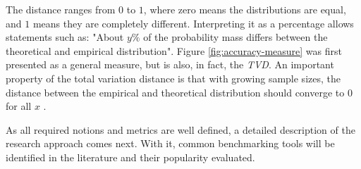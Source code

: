 The distance ranges from $0$ to $1$, where zero means the distributions are equal, and $1$ means they are completely different. Interpreting it as a percentage allows statements such as:
"About $y\%$ of the probability mass differs between the theoretical and empirical distribution". Figure \ref{fig:accuracy-measure} was first presented as a general measure,
but is also, in fact, the \textit{TVD}. An important property of the total variation distance is that with growing sample sizes,
the distance between the empirical and theoretical distribution should converge to 0 for 
all $x$ \cite{kengEmpiricalDistributionFunction2016}.
 
As all required notions and metrics are well defined, a detailed description of the research approach comes next. With it, common 
benchmarking tools will be identified in the literature and their popularity evaluated. 